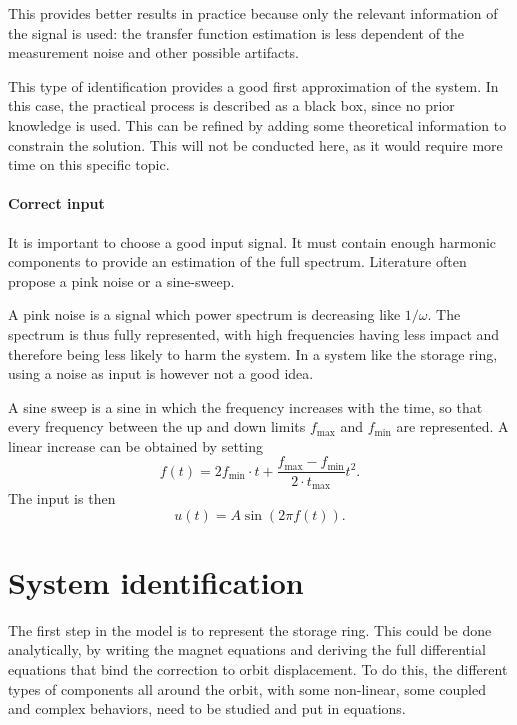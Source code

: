 This provides better results in practice because only the relevant information of the signal is used: the transfer function estimation is less dependent of the measurement noise and other possible artifacts.

This type of identification provides a good first approximation of the system. In this case, the practical process is described as a black box, since no prior knowledge is used. This can be refined by adding some theoretical information to constrain the solution. This will not be conducted here, as it would require more time on this specific topic.

\paragraph{Correct input}
It is important to choose a good input signal. It must contain enough harmonic components to provide an estimation of the full spectrum. Literature often propose a pink noise or a sine-sweep.

A pink noise is a signal which power spectrum is decreasing like $1/\omega$. The spectrum is thus fully represented, with high frequencies having less impact and therefore being less likely to harm the system. In a system like the storage ring, using a noise as input is however not a good idea. 

A sine sweep is a sine in which the frequency increases with the time, so that every frequency between the up and down limits $f_\text{max}$ and $f_\text{min}$ are represented. A linear increase can be obtained by setting
\begin{equation}
	f(t) = 2 f_\text{min} \cdot t + \frac{f_\text{max}-f_\text{min}}{2 \cdot t_\text{max}} t^2.
\end{equation}
The input is then
\begin{equation}
	u(t) = A \sin(2\pi f(t)).
\end{equation}

\section{System identification}
The first step in the model is to represent the storage ring. This could be done analytically, by writing the magnet equations and deriving the full differential equations that bind the correction to orbit displacement. To do this, the different types of components all around the orbit, with some non-linear, some coupled and complex behaviors, need to be studied and put in equations.

